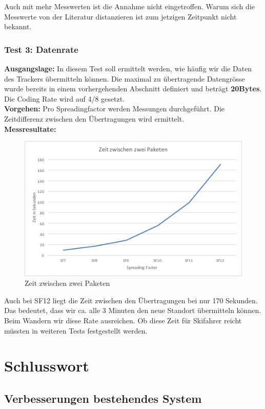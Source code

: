 \documentclass[11pt,english,german]{report}
\theoremstyle{definition}
\begin{document}
\noindent
Auch mit mehr Messwerten ist die Annahme nicht eingetroffen. Warum sich die Messwerte von der Literatur distanzieren ist zum jetzigen Zeitpunkt nicht bekannt.

\newpage
\subsection{Test 3: Datenrate}
\textbf{Ausgangslage:} In diesem Test soll ermittelt werden, wie häufig wir die Daten des Trackers übermitteln können. Die maximal zu übertragende Datengrösse wurde bereits in einem vorhergehenden Abschnitt definiert und beträgt \textbf{20Bytes}. Die Coding Rate wird auf 4/8 gesetzt.\\[0.3cm]
\textbf{Vorgehen:} Pro Spreadingfactor werden Messungen durchgeführt. Die Zeitdifferenz zwischen den Übertragungen wird ermittelt.\\[0.3cm]
\textbf{Messresultate:} 
\begin{figure}[H]
	\centering
	\includegraphics[width=\textwidth]{img/testing/timebetweenpakets.jpg}
	\caption[Zeit zwischen zwei Paketen]
	{Zeit zwischen zwei Paketen}
\end{figure}
\noindent
Auch bei SF12 liegt die Zeit zwischen den Übertragungen bei nur 170 Sekunden. Das bedeutet, dass wir ca. alle 3 Minuten den neue Standort übermitteln können. Beim Wandern wir diese Rate ausreichen. Ob diese Zeit für Skifahrer reicht müssten in weiteren Tests festgestellt werden.

\chapter{Schlusswort}
\section{Verbesserungen bestehendes System}
\end{document}

